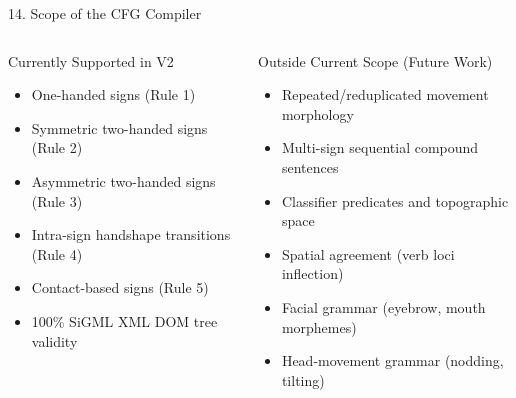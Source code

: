 \documentclass[aspectratio=169]{beamer}
\begin{document}
\begin{frame}{14. Scope of the CFG Compiler}
    \small
    \vspace{2mm}
    
    \begin{columns}[T]
        \begin{block}{Currently Supported in V2}
            \begin{itemize}
                \item[\textcolor{green!60!black}{$\checkmark$}] One-handed signs (Rule 1)
                \item[\textcolor{green!60!black}{$\checkmark$}] Symmetric two-handed signs (Rule 2)
                \item[\textcolor{green!60!black}{$\checkmark$}] Asymmetric two-handed signs (Rule 3)
                \item[\textcolor{green!60!black}{$\checkmark$}] Intra-sign handshape transitions (Rule 4)
                \item[\textcolor{green!60!black}{$\checkmark$}] Contact-based signs (Rule 5)
                \item[\textcolor{green!60!black}{$\checkmark$}] 100\% SiGML XML DOM tree validity
            \end{itemize}
        \end{block}
        
        \begin{block}{Outside Current Scope (Future Work)}
            \begin{itemize}
                \item[\textcolor{red}{$\times$}] Repeated/reduplicated movement morphology
                \item[\textcolor{red}{$\times$}] Multi-sign sequential compound sentences
                \item[\textcolor{red}{$\times$}] Classifier predicates and topographic space
                \item[\textcolor{red}{$\times$}] Spatial agreement (verb loci inflection)
                \item[\textcolor{red}{$\times$}] Facial grammar (eyebrow, mouth morphemes)
                \item[\textcolor{red}{$\times$}] Head-movement grammar (nodding, tilting)
            \end{itemize}
        \end{block}
    \end{columns}
    
    \vspace{6mm}
\end{frame}
\end{document}
